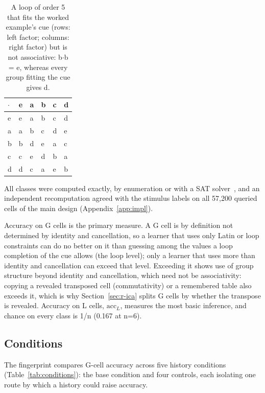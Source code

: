 \documentclass[11pt]{article}
\begin{document}
\begin{table}[tbp]
\centering
\small
\caption{A loop of order 5 that fits the worked example's cue (rows: left factor; columns: right factor) but is not associative: b$\cdot$b = e, whereas every group fitting the cue gives d.}\label{tab:worked-loop}
\begin{tabular}{@{}llllll@{}}
\toprule
$\cdot$ & e & a & b & c & d \\
\midrule
e & e & a & b & c & d \\
a & a & b & c & d & e \\
b & b & d & e & a & c \\
c & c & e & d & b & a \\
d & d & c & a & e & b \\
\bottomrule
\end{tabular}
\end{table}

All classes were computed exactly, by enumeration or with a SAT solver~\cite{ignatiev2018pysat}, and an independent recomputation agreed with the stimulus labels on all 57,200 queried cells of the main design (Appendix~\ref{app:impl}).

Accuracy on G cells is the primary measure. A G cell is by definition not determined by identity and cancellation, so a learner that uses only Latin or loop constraints can do no better on it than guessing among the values a loop completion of the cue allows (the loop level); only a learner that uses more than identity and cancellation can exceed that level. Exceeding it shows use of group structure beyond identity and cancellation, which need not be associativity: copying a revealed transposed cell (commutativity) or a remembered table also exceeds it, which is why Section~\ref{sec:r-ica} splits G cells by whether the transpose is revealed. Accuracy on L cells, $\mathrm{acc}_L$, measures the most basic inference, and chance on every class is 1/n (0.167 at n=6).

\subsection{Conditions}\label{sec:conditions}

The fingerprint compares G-cell accuracy across five history conditions (Table~\ref{tab:conditions}): the base condition and four controls, each isolating one route by which a history could raise accuracy.
\end{document}
